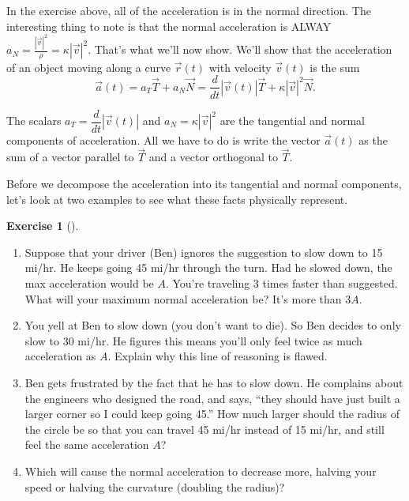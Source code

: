 \documentclass[10pt,]{book}
\theoremstyle{plain}
\theoremstyle{definition}
\theoremstyle{definition}
\theoremstyle{definition}
\theoremstyle{definition}
\newtheorem{exploration}[project]{Exercise}
\theoremstyle{definition}
\numberwithin{equation}{section}
\begin{document}
In the exercise above, all of the acceleration is in the normal direction. The interesting thing to note is that the normal acceleration is ALWAY \(a_N =  \frac{|\vec v|^2}{\rho}=\kappa |\vec v|^2\). That's what we'll now show. We'll show that the acceleration of an object moving along a curve \(\vec r(t)\) with velocity \(\vec v(t)\) is the sum%
\begin{equation*}
\vec a(t) = a_T\vec T+a_N\vec N=\frac{d}{dt}|\vec v(t)| \vec T + \kappa |\vec v|^2 \vec N.
\end{equation*}
%
\par
The scalars \(a_T=\dfrac{d}{dt}|\vec v(t)|\) and \(a_N=\kappa |\vec v|^2\) are the tangential and normal components of acceleration. All we have to do is write the vector \(\vec a(t)\) as the sum of a vector parallel to \(\vec T\) and a vector orthogonal to \(\vec T\).%
\par
Before we decompose the acceleration into its tangential and normal components, let's look at two examples to see what these facts physically represent.%
\begin{exploration}[]\label{exploration-183}
\leavevmode%
\begin{enumerate}[font=\bfseries,label=(\alph*),ref=\alph*]
\item\label{task-453} Suppose that your driver (Ben) ignores the suggestion to slow down to 15 mi/hr.  He keeps going 45 mi/hr through the turn. Had he slowed down, the max acceleration would be \(A\).  You're traveling 3 times faster than suggested.  What will your maximum normal acceleration be? It's more than \(3A\).%
%
\item\label{task-454} You yell at Ben to slow down (you don't want to die). So Ben decides to only slow to 30 mi/hr. He figures this means you'll only feel twice as much acceleration as \(A\).  Explain why this line of reasoning is flawed.%
\item\label{task-455} Ben gets frustrated by the fact that he has to slow down. He complains about the engineers who designed the road, and says, ``they should have just built a larger corner so I could keep going 45.''  How much larger should the radius of the circle be so that you can travel 45 mi/hr instead of 15 mi/hr, and still feel the same acceleration \(A\)?%
\item\label{task-456} Which will cause the normal acceleration to decrease more, halving your speed or halving the curvature (doubling the radius)?%
\end{enumerate}
\end{exploration}
\end{document}
